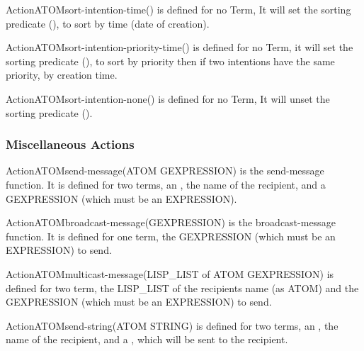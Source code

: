 \begin{typeefa}{Action}{ATOM}{sort-intention-time}{()}
is defined for no Term, It will set the sorting predicate (), to sort by time (date of 
creation).
\end{typeefa}

\begin{typeefa}{Action}{ATOM}{sort-intention-priority-time}{()}
is defined for no Term, it will set the sorting predicate (), to sort by priority then if two intentions have the
same priority, by creation time. 
\end{typeefa}

\begin{typeefa}{Action}{ATOM}{sort-intention-none}{()}
is defined for no Term, It will unset the sorting predicate (). 
\end{typeefa}

\subsubsection{Miscellaneous Actions}

\begin{typeefa}{Action}{ATOM}{send-message}{(ATOM GEXPRESSION)}
is the send-message function. It is defined for two terms, an , the
name of the recipient, and a GEXPRESSION (which must be an EXPRESSION).
\end{typeefa}

\begin{typeefa}{Action}{ATOM}{broadcast-message}{(GEXPRESSION)}
is the broadcast-message function. It is defined for one term, the
 GEXPRESSION (which must be an EXPRESSION) to send.
\end{typeefa}

\begin{typeefa}{Action}{ATOM}{multicast-message}{(LISP\_LIST of ATOM GEXPRESSION)}
 is defined for two term,  the LISP\_LIST of the recipients name (as ATOM) and
 the GEXPRESSION (which must be an EXPRESSION) to send. 
\end{typeefa}

\begin{typeefa}{Action}{ATOM}{send-string}{(ATOM STRING)}
  is defined for two terms, an , the name of the recipient, and a
  , which will be sent to the recipient.
\end{typeefa}

